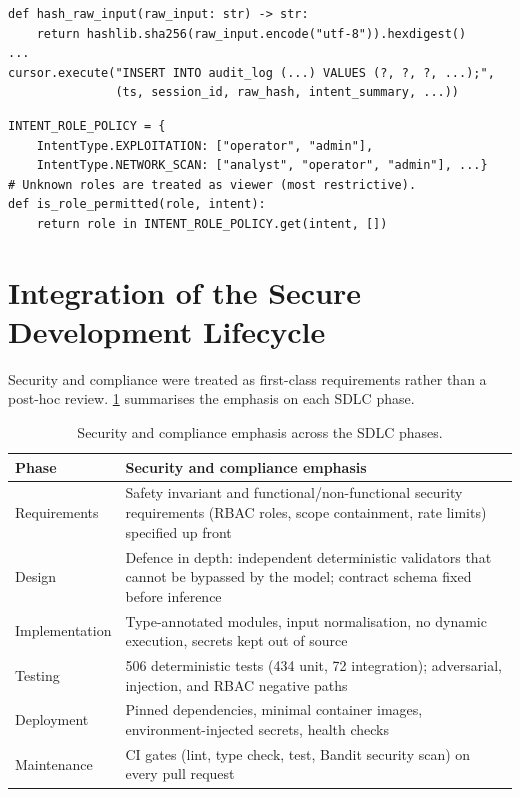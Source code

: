 \documentclass[10pt,journal,onecolumn]{IEEEtran}
\begin{document}
\begin{lstlisting}[caption={Privacy-preserving, parameterised audit write (\texttt{audit\_logger.py}).},label={lst:hash}]
def hash_raw_input(raw_input: str) -> str:
    return hashlib.sha256(raw_input.encode("utf-8")).hexdigest()
...
cursor.execute("INSERT INTO audit_log (...) VALUES (?, ?, ?, ...);",
               (ts, session_id, raw_hash, intent_summary, ...))
\end{lstlisting}

\begin{lstlisting}[caption={Least-privilege role gating (\texttt{rbac\_policy.py}).},label={lst:rbac}]
INTENT_ROLE_POLICY = {
    IntentType.EXPLOITATION: ["operator", "admin"],
    IntentType.NETWORK_SCAN: ["analyst", "operator", "admin"], ...}
# Unknown roles are treated as viewer (most restrictive).
def is_role_permitted(role, intent):
    return role in INTENT_ROLE_POLICY.get(intent, [])
\end{lstlisting}

\section{Integration of the Secure Development Lifecycle}
Security and compliance were treated as first-class requirements rather
than a post-hoc review. \cref{tab:sdlc} summarises the emphasis on each
SDLC phase.

\begin{table}[htbp]
  \centering
  \footnotesize
  \begin{tabular}{@{}p{}p{}@{}}
    \toprule
    \textbf{Phase} & \textbf{Security and compliance emphasis}\\
    \midrule
    Requirements & Safety invariant and functional/non-functional security requirements (RBAC roles, scope containment, rate limits) specified up front\\
    Design & Defence in depth: independent deterministic validators that cannot be bypassed by the model; contract schema fixed before inference\\
    Implementation & Type-annotated modules, input normalisation, no dynamic execution, secrets kept out of source\\
    Testing & 506 deterministic tests (434 unit, 72 integration); adversarial, injection, and RBAC negative paths\\
    Deployment & Pinned dependencies, minimal container images, environment-injected secrets, health checks\\
    Maintenance & CI gates (lint, type check, test, Bandit security scan) on every pull request\\
    \bottomrule
  \end{tabular}
  \caption{Security and compliance emphasis across the SDLC phases.}\label{tab:sdlc}
\end{table}
\end{document}
